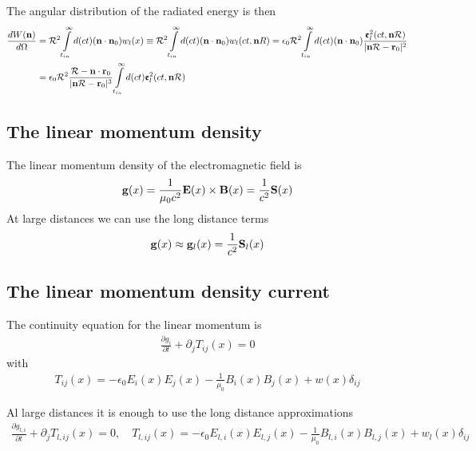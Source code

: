The angular distribution of the radiated energy is then
\begin{align}
    \frac{dW({\bf n})}{d\Omega} & ={\cal R}^2\int\limits_{t_{in}}^{\infty}d(ct)({\bf n}\cdot{\bf n}_0)w_l(x)\equiv {\cal R}^2\int\limits_{t_{in}}^{\infty}d(ct)({\bf n}\cdot{\bf n}_0)w_l(ct, {\bf n}R)=\epsilon_0{\cal R}^2\int\limits_{t_{in}}^{\infty}d(ct)({\bf n}\cdot{\bf n}_0)\frac{{\boldsymbol{\mathfrak e}}_l^2(ct, {\bf n}{\cal R})}{|{\bf n}{\cal R} - {\bf r}_0|^2}\nonumber \\
                                & =\epsilon_0{\cal R}^2\frac{{\cal R}-{\bf n}\cdot{\bf r}_0}{|{\bf n}{\cal R} - {\bf r}_0|^3}\int\limits_{t_{in}}^{\infty}d(ct){\boldsymbol{\mathfrak e}}_l^2 (ct, {\bf n}{\cal R})
\end{align}


\subsection{The linear momentum density}

The linear momentum density of the electromagnetic field is
\begin{align}
    {\bf g}(x) = \frac1{\mu_0c^2}{\bf E}(x)\times{\bf B}(x)=\frac1{c^2}{\bf S}(x)\label{g_exact}
\end{align}
At large distances we can use the long distance terms
\begin{align}
    {\bf g}(x)\approx {\bf g}_l(x)=\frac1{c^2}{\bf S}_l(x)
\end{align}



\subsection{The linear momentum density current}

The continuity equation for the linear momentum is
\begin{align}
    \frac{\partial g_i}{\partial t}+\partial_j T_{ij}(x)=0
\end{align}
with
\begin{align}
    T_{ij}(x) = -\epsilon_0E_i(x)E_j(x)-\frac1{\mu_0}B_i(x)B_j(x)+w(x)\delta_{ij}
\end{align}

Al large distances it is enough to use the long distance approximations
\begin{align}
    \frac{\partial g_{l,i}}{\partial t}+\partial_j T_{l,ij}(x)=0, \quad
    T_{l,ij}(x) = -\epsilon_0E_{l,i}(x)E_{l,j}(x)-\frac1{\mu_0}B_{l,i}(x)B_{l,j}(x)+w_l(x)\delta_{ij}
\end{align}



